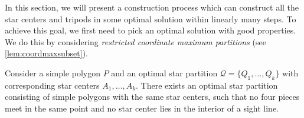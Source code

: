 \documentclass{theoretics}
\begin{document}
In this section, we will present a construction process which can construct all the star centers and tripods in some optimal solution within linearly many steps. 
To achieve this goal, we first need to pick an optimal solution with good properties. We do this by considering \emph{restricted coordinate maximum partitions} (see \cref{lem:coordmaxsubset}).

\begin{lemma}
    Consider a simple polygon $P$ and an optimal star partition $\mathcal{Q} = \{ Q_1, \dots, Q_k \}$ with corresponding star centers $A_1,\ldots,A_k$.
    There exists an optimal star partition consisting of simple polygons with the same star centers, such that no four pieces meet in the same point and no star center lies in the interior of a sight line.  
\end{lemma}
\end{document}
